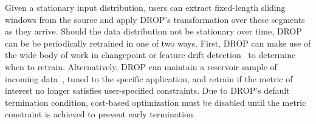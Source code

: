 



Given a stationary input distribution, users can extract fixed-length sliding windows from the source and apply DROP's transformation over these segments as they arrive. 
Should the data distribution not be stationary over time, DROP can be be periodically retrained in one of two ways. 
First, DROP can make use of the wide body of work in changepoint or feature drift detection~\cite{cp1, cp2} to determine when to retrain. 
Alternatively, DROP can maintain a reservoir sample of incoming data~\cite{reservoir}, tuned to the specific application, and retrain if the metric of interest no longer satisfies user-specified constraints. 
Due to DROP's default termination condition, cost-based optimization must be disabled until the metric constraint is achieved to prevent early termination.




